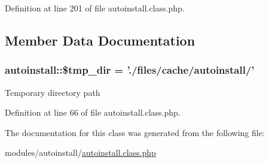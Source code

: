 Definition at line 201 of file autoinstall.\-class.\-php.



\subsection{Member Data Documentation}
\hypertarget{classautoinstall_a157882a0b8cc81818aa516880f2ba5dc}{
\subsubsection[{\$tmp\-\_\-dir}]{\setlength{\rightskip}{0pt plus 5cm}autoinstall\-::\$tmp\-\_\-dir = './files/cache/{\bf autoinstall}/'}}\label{classautoinstall_a157882a0b8cc81818aa516880f2ba5dc}
Temporary directory path 

Definition at line 66 of file autoinstall.\-class.\-php.



The documentation for this class was generated from the following file\-:\begin{DoxyCompactItemize}
\item 
modules/autoinstall/\hyperlink{autoinstall_8class_8php}{autoinstall.\-class.\-php}\end{DoxyCompactItemize}
